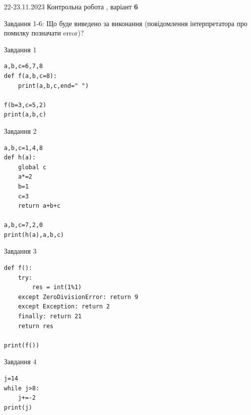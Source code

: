 \documentclass[12pt, ukrainian]{article}
\begin{document}
{{22-23.11.2023 Контрольна робота , варіант  \No \textbf { 6 }\par}}
{

Завдання 1-6: Що буде виведено за виконання (повідомлення інтерпретатора про помилку позначати error)?


\begin{minipage}[t]{9.7cm}                
{\begin{center}Завдання {1}\end{center}}
\begin{verbatim}
a,b,c=6,7,8
def f(a,b,c=8):
    print(a,b,c,end=" ")

f(b=3,c=5,2)
print(a,b,c)
\end{verbatim}     
\end{minipage}
\vline \hspace{8mm}
\begin{minipage}[t]{8.0cm}                
{\begin{center}Завдання {2}\end{center}}
\begin{verbatim}
a,b,c=1,4,8
def h(a):
    global c
    a*=2
    b=1
    c=3
    return a+b+c

a,b,c=7,2,0
print(h(a),a,b,c)
\end{verbatim}     
\end{minipage}

\vspace{15mm}
\begin{minipage}[t]{9.7cm}                
{\begin{center}Завдання {3}\end{center}}
\begin{verbatim}
def f():
    try:
        res = int(1%1)
    except ZeroDivisionError: return 9
    except Exception: return 2
    finally: return 21
    return res

print(f())
\end{verbatim}     
\end{minipage}
\vline \hspace{8mm}
\begin{minipage}[t]{8.0cm}                
{\begin{center}Завдання {4}\end{center}}
\begin{verbatim}
j=14
while j>8:
    j+=-2
print(j)
\end{verbatim}     
\end{minipage}

}
\end{document}
